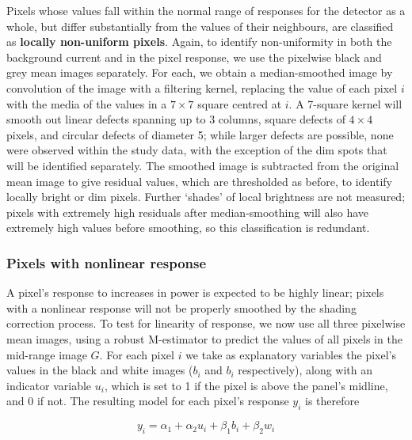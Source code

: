 \documentclass[\main/IO-Pixels.tex]{subfiles}
\begin{document}
Pixels whose values fall within the normal range of responses for the detector as a whole, but differ substantially from the values of their neighbours, are classified as \textbf{locally non-uniform pixels}. Again, to identify non-uniformity in both the background current and in the pixel response, we use the pixelwise black and grey mean images separately. For each, we obtain a median-smoothed image by convolution of the image with a filtering kernel, replacing the value of each pixel $i$ with the media of the values in a $7 \times 7$ square centred at $i$. A 7-square kernel will smooth out linear defects spanning up to 3 columns, square defects of $4 \times 4$ pixels, and circular defects of diameter 5; while larger defects are possible, none were observed  within the study data, with the exception of the dim spots that will be identified separately. The smoothed image is subtracted from the original mean image to give residual values, which are thresholded as before, to identify locally bright or dim pixels. Further `shades' of local brightness are not measured; pixels with extremely high residuals after median-smoothing will also have extremely high values before smoothing, so this classification is redundant. 


\subsubsection{Pixels with nonlinear response}

A pixel's response to increases in power is expected to be highly linear;  pixels with a nonlinear response will not be properly smoothed by the shading correction process. To test for linearity of response, we now use all three pixelwise mean images, using a robust M-estimator to predict the values of all pixels in the mid-range image $G$. For each pixel $i$ we take as explanatory variables the pixel's values in the black and white images ($b_i$ and $b_i$ respectively), along with an indicator variable $u_i$, which is set to 1 if the pixel is above the panel's midline, and 0 if not. The resulting model for each pixel's response $y_i$ is therefore

\begin{equation}
    y_i = \alpha_1 + \alpha_2 u_i + \beta_1 b_i + \beta_2 w_i
\end{equation}
\end{document}
